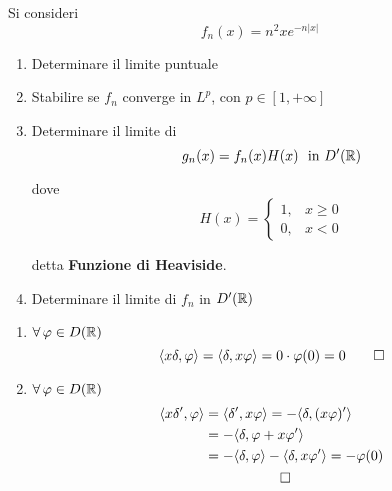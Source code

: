 Si consideri
\begin{equation*}
f_{n}(x) = n^{2} xe^{ - n| x| }
\end{equation*}
\begin{enumerate}
\item Determinare il limite puntuale
\item Stabilire se $f_{n}$ converge in $L^{p}$, con $p\in [ 1, + \infty ]$
\item Determinare il limite di\begin{equation*}
g_{n}(x) = f_{n}(x) H(x) \ \ \text{in} \ D'(\mathbb{R})
\end{equation*}

dove\begin{equation*}
H(x) = \begin{cases}
1, & x\geq 0\\
0, & x < 0
\end{cases}
\end{equation*}

detta \textbf{Funzione di Heaviside}.
\item Determinare il limite di $f_{n}$ in $D'(\mathbb{R})$
\end{enumerate}
\ParteSoluzioni
\Soluzione
\begin{enumerate}
\item $\forall \varphi \in D(\RR)$\begin{equation*}
\langle x\delta ,\varphi \rangle = \langle \delta ,x\varphi \rangle = 0\cdot \varphi (0) = 0\qed 
\end{equation*}
\item $\forall \varphi \in D(\RR)$\begin{gather*}
\begin{aligned}
\langle x\delta ',\varphi \rangle  & = \langle \delta ',x\varphi \rangle = - \langle \delta ,(x\varphi) '\rangle \\
 & = - \langle \delta ,\varphi + x\varphi '\rangle \\
 & = - \langle \delta ,\varphi \rangle - \langle \delta ,x\varphi '\rangle = - \varphi (0)
\end{aligned}\\
\qed 
\end{gather*}
\end{enumerate}
\Soluzione

